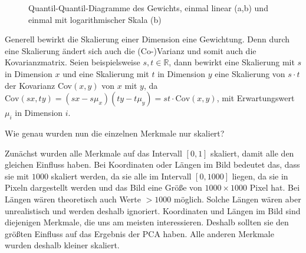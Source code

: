 \begin{figure}
  \qquad
  \qquad
  
  \caption{ Quantil-Quantil-Diagramme des Gewichts, einmal linear (a,b) und einmal mit logarithmischer Skala (b)}
  \label{qqdiagrams_weight}
 \end{figure}
 
 Generell bewirkt die Skalierung einer Dimension eine Gewichtung. Denn durch eine Skalierung ändert sich auch die (Co-)Varianz und somit auch die Kovarianzmatrix. Seien beispielsweise $s,t \in \mathbb{R}$, dann bewirkt eine Skalierung mit $s$ in Dimension $x$ und eine Skalierung mit $t$ in Dimension $y$ eine Skalierung von $s \cdot t$ der Kovarianz Cov$(x,y)$ von $x$ mit $y$, da $\mathrm{Cov}(sx, ty) = (sx - s\mu_x) (ty - t\mu_y) = st \cdot \mathrm{Cov}(x,y)$, mit Erwartungswert $\mu_i$ in Dimension $i$.
 
 Wie genau wurden nun die einzelnen Merkmale nur skaliert?
 
 Zunächst wurden alle Merkmale auf das Intervall $[0, 1]$ skaliert, damit alle den gleichen Einfluss haben.
 Bei Koordinaten oder Längen im Bild bedeutet das, dass sie mit $1000$ skaliert werden, da sie alle im Intervall $[0, 1000]$ liegen, da sie in Pixeln dargestellt werden und das Bild eine Größe von $1000 \times 1000$ Pixel hat. Bei Längen wären theoretisch auch Werte $> 1000$ möglich. Solche Längen wären aber unrealistisch und werden deshalb ignoriert.
 Koordinaten und Längen im Bild sind diejenigen Merkmale, die uns am meisten interessieren. Deshalb sollten sie den größten Einfluss auf das Ergebnis der PCA haben. Alle anderen Merkmale wurden deshalb kleiner skaliert.
 
